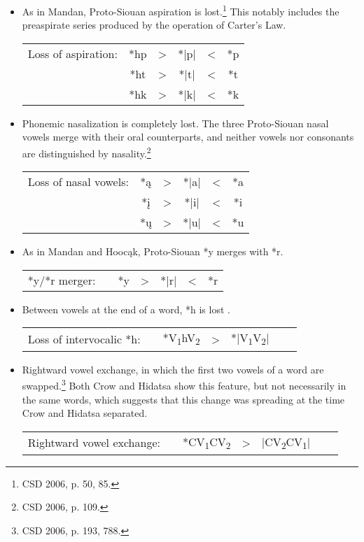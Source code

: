 \documentclass[output=paper]{LSP/langsci}
\begin{document}
\begin{itemize}
\item As in Mandan, Proto-Siouan aspiration is lost.\footnote{CSD 2006, p. 50, 85.} This notably includes the preaspirate series produced by the operation of Carter's Law.
\begin{center}				
\begin{tabular}[t]{c c c c c c }
Loss of aspiration: & *hp & > & *|p|	& < & 	*p \\
& *ht	 & > & *|t|	& <	 & *t \\
& *hk & > & *|k|	 & < & *k \\
\end{tabular}
\end{center}

\item Phonemic nasalization is completely lost.  The three Proto-Siouan nasal vowels merge with their oral counterparts, and neither vowels nor consonants are distinguished by nasality.\footnote{CSD 2006, p. 109.}
\begin{center}
\begin{tabular}[t]{c c c c c c }
Loss of nasal vowels: &	*\k{a} & >	& *|a| & < & *a \\
& *\k{i} & > & *|i| & < & *i \\
& *\k{u} & > & *|u| & < & *u \\
\end{tabular}
\end{center}

\item As in Mandan and Hooc\k{a}k, Proto-Siouan *y merges with *r.

\begin{center}
\begin{tabular}[t]{c c c c c c c}
*y/*r merger: & & *y	 & >  & *|r| &  <	 & *r 
\end{tabular}
\end{center}

\item Between vowels at the end of a word, *h is lost .

\begin{center}
\begin{tabular}[t]{c c c c c c c}
Loss of intervocalic *h: & & *V\textsubscript{1}hV\textsubscript{2} & > & *|V\textsubscript{1}V\textsubscript{2}|	
\end{tabular}
\end{center}

\item Rightward vowel exchange, in which the first two vowels of a word are swapped.\footnote{CSD 2006, p. 193, 788.}  Both Crow and Hidatsa show this feature, but not necessarily in the same words, which suggests that this change was spreading at the time Crow and Hidatsa separated.

\begin{center}
\begin{tabular}[t]{c c c c c c c}
Rightward vowel exchange:	 & & *CV\textsubscript{1}CV\textsubscript{2} & > & |CV\textsubscript{2}CV\textsubscript{1}|	
\end{tabular}
\end{center}
\end{itemize}
\end{document}
